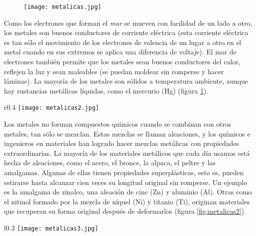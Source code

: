 \begin{figure}[H]
    \centering
    \texttt{[image: metalicas.jpg]}
    \label{fig:metalicas}
\end{figure}

Como los electrones que forman el \emph{mar} se mueven con facilidad de un lado a otro, los metales
son buenos conductores de corriente eléctrica (esta corriente eléctrica es tan sólo el movimiento de
los electrones de valencia de un lugar a otro en el metal cuando en sus extremos se aplica una
diferencia de voltaje). El mar de electrones también permite que los metales sean buenos conductores
del calor, reflejen la luz y sean maleables (se puedan moldear sin romperse y hacer láminas).
La mayoría de los metales son sólidos a temperatura ambiente, aunque hay sustancias metálicas
líquidas, como el mercurio (Hg) (figura \ref{fig:metalicas}).

\begin{wrapfigure}{r}{0.4\textwidth}
    \centering
    \texttt{[image: metalicas2.jpg]}
    \label{fig:metalicas2}
\end{wrapfigure}

Los metales no forman compuestos químicos cuando se combinan con otros metales, tan sólo se mezclan.
Estas mezclas se llaman aleaciones, y los químicos e ingenieros en materiales han logrado
hacer mezclas metálicas con propiedades extraordinarias. La mayoría de los materiales metálicos
que cada día usamos está hecha de aleaciones, como el acero, el bronce, la alpaca, el peltre y
las amalgamas. Algunas de ellas tienen propiedades superplásticas, esto es, pueden estirarse
hasta alcanzar cien veces su longitud original sin romperse. Un ejemplo es la amalgama de zinalco,
una aleación de cinc (Zn) y aluminio (Al). Otras como el nitinol formado por la mezcla de níquel (Ni)
y titanio (Ti), originan materiales que recuperan su forma original después de deformarlos (figura \ref{fig:metalicas2}).

\begin{wrapfigure}{l}{0.3\textwidth}
    \centering
    \texttt{[image: metalicas3.jpg]}
    \label{fig:metalicas3}
\end{wrapfigure}

